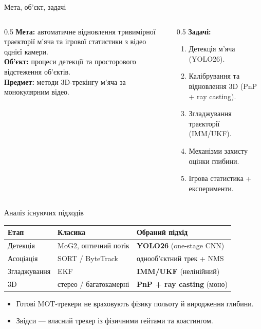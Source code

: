 \documentclass[aspectratio=169,11pt]{beamer}
\begin{document}
\begin{frame}{Мета, об'єкт, задачі}
  \begin{columns}[T]
    \begin{column}{0.5\textwidth}
      \textbf{Мета:} автоматичне відновлення тривимірної траєкторії м'яча та ігрової
      статистики з відео однієї камери.\\[4pt]
      \textbf{Об'єкт:} процеси детекції та просторового відстеження об'єктів.\\[4pt]
      \textbf{Предмет:} методи 3D-трекінгу м'яча за монокулярним відео.
    \end{column}
    \begin{column}{0.5\textwidth}
      \textbf{Задачі:}
      \begin{enumerate}
        \item Детекція м'яча (YOLO26).
        \item Калібрування та відновлення 3D (PnP + ray casting).
        \item Згладжування траєкторії (IMM/UKF).
        \item Механізми захисту оцінки глибини.
        \item Ігрова статистика + експерименти.
      \end{enumerate}
    \end{column}
  \end{columns}
\end{frame}

\begin{frame}{Аналіз існуючих підходів}
  \centering
  \begin{tabular}{@{}lll@{}}
    \toprule
    \textbf{Етап} & \textbf{Класика} & \textbf{Обраний підхід} \\
    \midrule
    Детекція   & MoG2, оптичний потік & \textbf{YOLO26} (one-stage CNN) \\
    Асоціація  & SORT / ByteTrack     & однооб'єктний трек + NMS \\
    Згладжування & EKF                & \textbf{IMM/UKF} (нелінійний) \\
    3D         & стерео / багатокамерні & \textbf{PnP + ray casting} (моно) \\
    \bottomrule
  \end{tabular}
  \vspace{6pt}
  \begin{itemize}
    \item Готові MOT-трекери не враховують фізику польоту й виродження глибини.
    \item Звідси — власний трекер із фізичними гейтами та коастингом.
  \end{itemize}
\end{frame}
\end{document}
